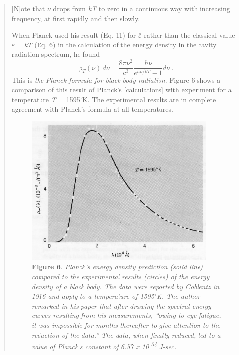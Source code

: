 \begin{quotation}
{[}N{]}ote that $\nu$ drops from \emph{kT} to zero in a continuous
way with increasing frequency, at first rapidly and then slowly.

When Planck used his result (Eq. 11) for $\bar{\varepsilon}$ rather than the classical value
$\bar{\varepsilon} = kT$ (Eq. 6) in the calculation of the energy density in the
cavity radiation spectrum, he found
\begin{equation}
\rho_T(\nu)\, d\nu = \frac{8\pi\nu^2}{c^3} \frac{h\nu}{e^{h\nu/kT}-1} d\nu \; . %
\end{equation}
This is \emph{the Planck formula for black body radiation}. Figure 6
shows a comparison of this result of Planck's {[}calculations{]} with
experiment for a temperature \emph{T} = 1595$^\circ$K. The experimental results
are in complete agreement with Planck's formula at all temperatures.

%
\begin{figure}[h]
  \begin{center}
  \captionsetup{width=4.6875in}
  \includegraphics[width=3.6875in,height=2.92708in]{images/05_planck/image037.jpg}
  \caption*{\textbf{Figure 6}. \emph{Planck's energy density prediction (solid line)
    compared to the experimental results (circles) of the energy density of
    a black body. The data were reported by Coblentz in 1916 and apply to a
    temperature of 1595$^\circ$K. The author remarked in his paper that after
    drawing the spectral energy curves resulting from his measurements,
    ``owing to eye fatigue, it was impossible for months thereafter to give
    attention to the reduction of the data.'' The data, when finally
    reduced, led to a value of Planck's constant of 6.57 x
    10\textsuperscript{-34} J-sec.}}
  \end{center}
\end{figure}
\end{quotation}

